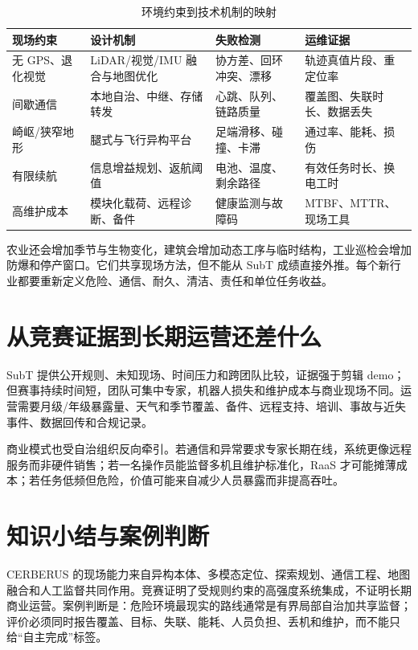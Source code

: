 \begin{table}[H]
\begingroup{}
\centering
\caption{环境约束到技术机制的映射}
\label{tab:field-constraint-mechanism}
\begin{tabularx}{\textwidth}{p{}YYp{0.23\textwidth}}
\toprule
现场约束 & 设计机制 & 失败检测 & 运维证据 \\
\midrule
无 GPS、退化视觉 & LiDAR/视觉/IMU 融合与地图优化 & 协方差、回环冲突、漂移 & 轨迹真值片段、重定位率 \\
间歇通信 & 本地自治、中继、存储转发 & 心跳、队列、链路质量 & 覆盖图、失联时长、数据丢失 \\
崎岖/狭窄地形 & 腿式与飞行异构平台 & 足端滑移、碰撞、卡滞 & 通过率、能耗、损伤 \\
有限续航 & 信息增益规划、返航阈值 & 电池、温度、剩余路径 & 有效任务时长、换电工时 \\
高维护成本 & 模块化载荷、远程诊断、备件 & 健康监测与故障码 & MTBF、MTTR、现场工具 \\
\bottomrule
\end{tabularx}
\endgroup
\end{table}

农业还会增加季节与生物变化，建筑会增加动态工序与临时结构，工业巡检会增加防爆和停产窗口。它们共享现场方法，但不能从 SubT 成绩直接外推。每个新行业都要重新定义危险、通信、耐久、清洁、责任和单位任务收益。

\section{从竞赛证据到长期运营还差什么}

SubT 提供公开规则、未知现场、时间压力和跨团队比较，证据强于剪辑 demo；但赛事持续时间短，团队可集中专家，机器人损失和维护成本与商业现场不同。运营需要月级/年级暴露量、天气和季节覆盖、备件、远程支持、培训、事故与近失事件、数据回传和合规记录。

商业模式也受自治组织反向牵引。若通信和异常要求专家长期在线，系统更像远程服务而非硬件销售；若一名操作员能监督多机且维护标准化，RaaS 才可能摊薄成本；若任务低频但危险，价值可能来自减少人员暴露而非提高吞吐。

\section{知识小结与案例判断}

CERBERUS 的现场能力来自异构本体、多模态定位、探索规划、通信工程、地图融合和人工监督共同作用。竞赛证明了受规则约束的高强度系统集成，不证明长期商业运营。案例判断是：危险环境最现实的路线通常是有界局部自治加共享监督；评价必须同时报告覆盖、目标、失联、能耗、人员负担、丢机和维护，而不能只给“自主完成”标签。
